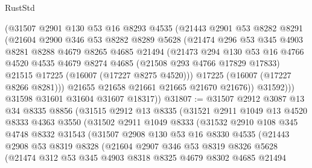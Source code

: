 \begin{lexlean}{RustStd}
\begin{coremodule}
            (@31507
              @2901
              @130
              @53
              @16
              @8293
              @4535
              (@21443
                @2901
                @53
                @8282
                @8291
                (@21604
                  @2900
                  @346
                  @53
                  @8282
                  @8289
                  @5628
                  (@21474
                    @296
                    @53
                    @345
                    @4903
                    @8281
                    @8288
                    @4679
                    @8265
                    @4685
                    @21494
                    (@21473
                      @294
                      @130
                      @53
                      @16
                      @4766
                      @4520
                      @4535
                      @4679
                      @8274
                      @4685
                      (@21508 @293 @4766 @17829 @17833)
                      @21515
                      @17225
                      (@16007 (@17227 @8275 @4520)))
                    @17225
                    (@16007 (@17227 @8266 @8281)))
                  @21655
                  @21658
                  @21661
                  @21665
                  @21670
                  @21676))
              @31592)))
        @31598
        @31601
        @31604
        @31607
        @18317))
@31807 := @31507
    @2912
    @3087
    @13
    @34
    @8335
    @8856
    (@31515
      @2912
      @13
      @8335
      (@31521
        @2911
        @1049
        @13
        @4520
        @8333
        @4363
        @3550
        (@31502
          @2911
          @1049
          @8333
          (@31532
            @2910
            @108
            @345
            @4748
            @8332
            @31543
            (@31507
              @2908
              @130
              @53
              @16
              @8330
              @4535
              (@21443
                @2908
                @53
                @8319
                @8328
                (@21604
                  @2907
                  @346
                  @53
                  @8319
                  @8326
                  @5628
                  (@21474
                    @312
                    @53
                    @345
                    @4903
                    @8318
                    @8325
                    @4679
                    @8302
                    @4685
                    @21494

\end{coremodule}
\end{lexlean}
